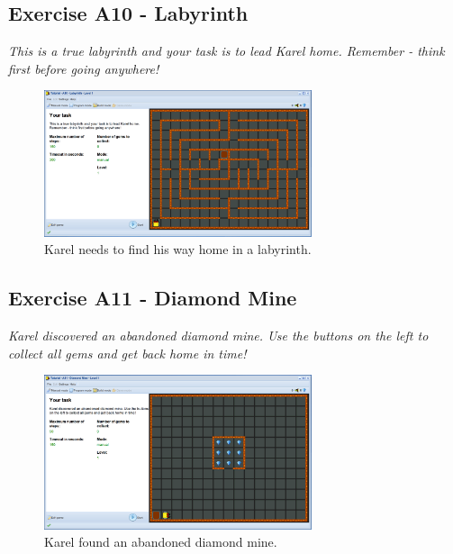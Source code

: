 \documentclass[article,A4,12pt]{llncs}
\begin{document}
\subsection{Exercise A10 - Labyrinth}

{\em This is a true labyrinth and your task is to lead Karel 
home. Remember - think first before going anywhere!}

\begin{figure}[!ht]
\begin{center}
\includegraphics[width=0.7\textwidth]{img/a10.png}
\end{center}
\vspace{-4mm}
\caption{Karel needs to find his way home in a labyrinth.}
\label{fig:a10}
\vspace{-4mm}
\end{figure}
\noindent


\subsection{Exercise A11 - Diamond Mine}

{\em Karel discovered an abandoned diamond mine. Use the buttons
on the left to collect all gems and get back home in time!}

\begin{figure}[!ht]
\begin{center}
\includegraphics[width=0.7\textwidth]{img/a11.png}
\end{center}
\vspace{-4mm}
\caption{Karel found an abandoned diamond mine.}
\label{fig:a11}
\vspace{-4mm}
\end{figure}
\noindent
\newpage
\end{document}
